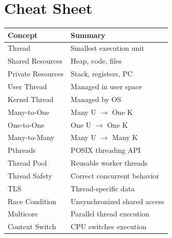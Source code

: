 \section{Cheat Sheet}

\begin{longtable}{|p{5cm}|p{8cm}|}
\hline
Concept & Summary \\
\hline
Thread & Smallest execution unit \\
\hline
Shared Resources & Heap, code, files \\
\hline
Private Resources & Stack, registers, PC \\
\hline
User Thread & Managed in user space \\
\hline
Kernel Thread & Managed by OS \\
\hline
Many-to-One & Many U $\rightarrow$ One K \\
\hline
One-to-One & One U $\rightarrow$ One K \\
\hline
Many-to-Many & Many U $\rightarrow$ Many K \\
\hline
Pthreads & POSIX threading API \\
\hline
Thread Pool & Reusable worker threads \\
\hline
Thread Safety & Correct concurrent behavior \\
\hline
TLS & Thread-specific data \\
\hline
Race Condition & Unsynchronized shared access \\
\hline
Multicore & Parallel thread execution \\
\hline
Context Switch & CPU switches execution \\
\hline
\end{longtable}